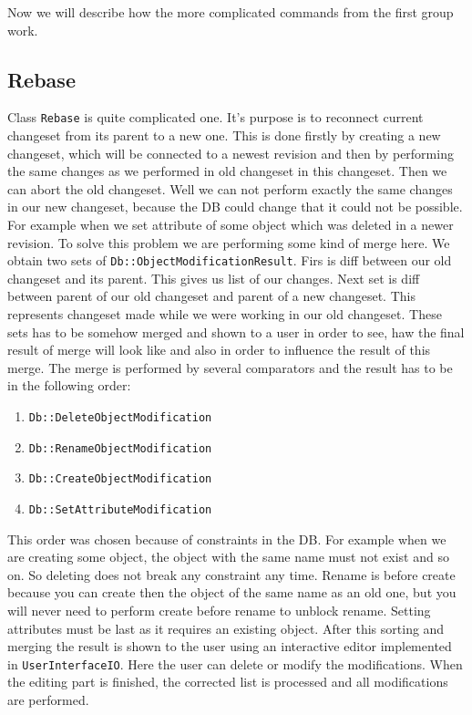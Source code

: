 \documentclass[deska]{subfiles}
\begin{document}
Now we will describe how the more complicated commands from the first group work.

\subsection{Rebase}


Class {\tt Rebase} is quite complicated one. It's purpose is to reconnect current changeset from its parent to a new
one. This is done firstly by creating a new changeset, which will be connected to a newest revision and then by performing
the same changes as we performed in old changeset in this changeset. Then we can abort the old changeset. Well we can not
perform exactly the same changes in our new changeset, because the DB could change that it could not be possible. For
example when we set attribute of some object which was deleted in a newer revision. To solve this problem we are performing
some kind of merge here. We obtain two sets of {\tt Db::ObjectModificationResult}. Firs is diff between our old changeset
and its parent. This gives us list of our changes. Next set is diff between parent of our old changeset and parent of a
new changeset. This represents changeset made while we were working in our old changeset. These sets has to be somehow
merged and shown to a user in order to see, haw the final result of merge will look like and also in order to influence
the result of this merge. The merge is performed by several comparators and the result has to be in the following order:
\begin{enumerate}
    \item {\tt Db::DeleteObjectModification}
    \item {\tt Db::RenameObjectModification}
    \item {\tt Db::CreateObjectModification}
    \item {\tt Db::SetAttributeModification}
\end{enumerate}
This order was chosen because of constraints in the DB. For example when we are creating some object, the object with
the same name must not exist and so on. So deleting does not break any constraint any time. Rename is before create
because you can create then the object of the same name as an old one, but you will never need to perform create before
rename to unblock rename. Setting attributes must be last as it requires an existing object. After this sorting and
merging the result is shown to the user using an interactive editor implemented in {\tt UserInterfaceIO}. Here the user
can delete or modify the modifications. When the editing part is finished, the corrected list is processed and
all modifications are performed.
\end{document}
